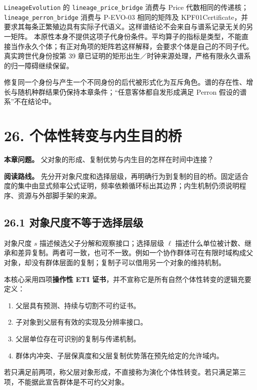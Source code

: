 \documentclass[
  11pt,
  oneside]{book}
\providecommand{\tightlist}{%
  \setlength{\itemsep}{0pt}\setlength{\parskip}{0pt}}
\begin{document}
\nolinkurl{LineageEvolution} 的 \nolinkurl{lineage_price_bridge} 消费与 Price 代数相同的传递核；\nolinkurl{lineage_perron_bridge} 消费与 P-EVO-03 相同的矩阵及 KPF01Certificate，并要求其每条正繁殖边具有实际子代语义。这样谱结论不会来自与谱系记录无关的另一矩阵。 本原性本身不提供这项子代身份条件。平均算子的指标是类型，不能直接当作永久个体；有正对角项的矩阵若这样解释，会要求个体是自己的不同子代。真实跨世代身份按第 39 章已证明的矩形出生／时钟来源处理，严格有限永久谱系的归一障碍继续保留。

修复同一个身份与产生一个不同身份的后代被形式化为互斥角色。谱的存在性、增长与随机种群结果仍保持本章条件；``任意客体都自发形成满足 Perron 假设的谱系''不在结论中。

\chapter{26. 个体性转变与内生目的桥}\label{ch-26}

\textbf{本章问题。} 父对象的形成、复制优势与内生目的怎样在时间中连接？

\textbf{阅读路线。} 先分开对象尺度和选择层级，再明确行为到复制的目的桥。固定适合度的集中由显式频率公式证明，频率依赖循环标出其边界；内生机制仍须说明程序、资源与外部脚手架的来源。

\section{26.1 对象尺度不等于选择层级}\label{ux5bf9ux8c61ux5c3aux5ea6ux4e0dux7b49ux4e8eux9009ux62e9ux5c42ux7ea7}

对象尺度 \(s\) 描述候选父子分解和观察接口；选择层级 \(\ell\) 描述什么单位被计数、继承和差异复制。两者可一致，也可不一致。例如一个协作群体可在有限时域构成父对象，却没有群体层面的复制；复制子可以借用另一个对象的维持机制。

本核心采用四项\textbf{操作性 ETI 证书}，并不宣称它是所有自然个体性转变的逻辑充要定义：

\begin{enumerate}
\def\labelenumi{\arabic{enumi}.}
\tightlist
\item
  父层具有预测、持续与切割不可约证书。
\item
  子对象到父层有有效的实现及分辨率接口。
\item
  父层单位存在可识别的复制与传递机制。
\item
  群体内冲突、子层保真度和父层复制优势落在预先给定的允许域内。
\end{enumerate}

若只满足前两项，称父层对象形成，不直接称为演化个体性转变。若只满足第三项，不能据此宣告群体是不可约父对象。
\end{document}
